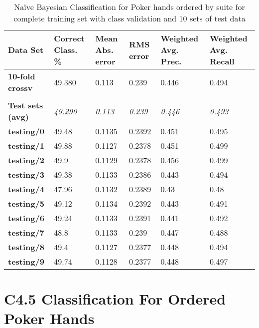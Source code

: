 \documentclass[10pt, a4paper]{article}
\begin{document}
\begin{table}[htbp]
  \centering
  \begin{tabular}{p{3cm}p{1.5cm}p{1.5cm}p{1.5cm}p{1.5cm}p{1.5cm}}
    \toprule
    \textbf{Data Set} & Correct Class. \% & Mean Abs. error & RMS error & Weighted Avg. Prec. & Weighted Avg. Recall \\
    \midrule
    \textbf{10-fold crossv} & 49.380 & 0.113 & 0.239 & 0.446 & 0.494 \\
    \textbf{} &       &       &       &       &  \\
    \textbf{Test sets (avg)} & \textit{49.290} & \textit{0.113} & \textit{0.239} & \textit{0.446} & \textit{0.493} \\
    \textbf{   testing/0} & 49.48 & 0.1135 & 0.2392 & 0.451 & 0.495 \\
    \textbf{   testing/1} & 49.88 & 0.1127 & 0.2378 & 0.451 & 0.499 \\
    \textbf{   testing/2} & 49.9  & 0.1129 & 0.2378 & 0.456 & 0.499 \\
    \textbf{   testing/3} & 49.38 & 0.1133 & 0.2386 & 0.443 & 0.494 \\
    \textbf{   testing/4} & 47.96 & 0.1132 & 0.2389 & 0.43  & 0.48 \\
    \textbf{   testing/5} & 49.12 & 0.1134 & 0.2392 & 0.443 & 0.491 \\
    \textbf{   testing/6} & 49.24 & 0.1133 & 0.2391 & 0.441 & 0.492 \\
    \textbf{   testing/7} & 48.8  & 0.1133 & 0.239 & 0.447 & 0.488 \\
    \textbf{   testing/8} & 49.4  & 0.1127 & 0.2377 & 0.448 & 0.494 \\
    \textbf{   testing/9} & 49.74 & 0.1128 & 0.2377 & 0.448 & 0.497 \\
    \bottomrule
    \end{tabular}%

	\caption{Na\"ive Bayesian Classification for Poker hands ordered by suite for complete training set with class validation and 10 sets of test data}   
  \label{tab:nbosresults}%
\end{table}%


\clearpage

\section{C4.5 Classification For Ordered Poker Hands}
\label{app:c45}
\end{document}
